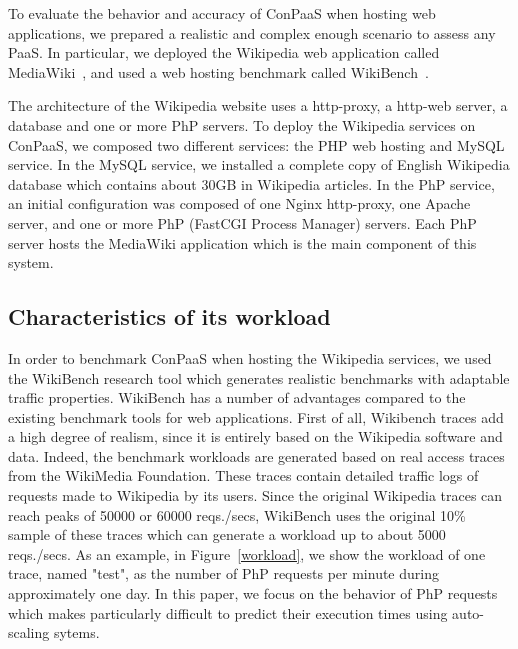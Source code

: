 To evaluate the behavior and accuracy of ConPaaS when hosting web applications, we prepared a realistic and complex enough scenario to assess any PaaS. In particular, we deployed the Wikipedia web application called MediaWiki~\cite{mediawiki}, and used a web hosting benchmark called WikiBench~\cite{wikibench}. 


The architecture of the Wikipedia website uses a http-proxy, a http-web server, a database and one or more PhP servers. To deploy the Wikipedia services on ConPaaS, we composed two different services: the PHP web hosting and MySQL service. In the MySQL service, we installed a complete copy of English Wikipedia database which contains about 30GB in Wikipedia articles. In the PhP service, an initial configuration was composed of one Nginx http-proxy, one Apache server, and one or more PhP (FastCGI Process Manager) servers. Each PhP server hosts the MediaWiki application which is the main component of this system. 


\subsection{Characteristics of its workload}

In order to benchmark ConPaaS when hosting the Wikipedia services, we used the WikiBench research tool which generates realistic benchmarks with adaptable traffic properties. WikiBench has a number of advantages compared to the existing benchmark tools for web applications. First of all, Wikibench traces add a high degree of realism, since it is entirely based on the Wikipedia software and data. Indeed, the benchmark workloads are generated based on real access traces from the WikiMedia Foundation. These traces contain detailed  traffic logs of requests made to Wikipedia by its users. Since the original Wikipedia traces can reach peaks of 50000 or 60000 reqs./secs, WikiBench uses the original 10\% sample of these traces which can generate a workload up to about 5000 reqs./secs. As an example, in Figure~\ref{workload}, we show the workload of one trace, named "test", as the number of PhP requests per minute during approximately one day.  In this paper, we focus on the behavior of PhP requests which makes particularly difficult to predict their execution times using auto-scaling sytems. 

